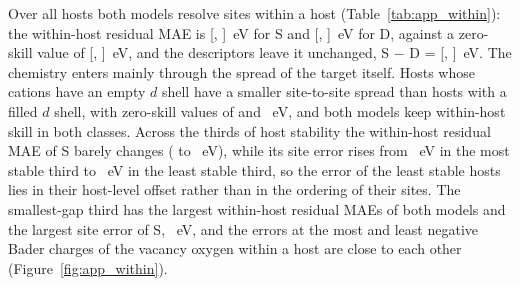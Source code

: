 Over all hosts both models resolve sites within a host (Table~\ref{tab:app_within}): the within-host residual MAE is \numNetWithinMaeS{} [\numNetWithinMaeSLo{}, \numNetWithinMaeSHi{}]~eV for S and \numNetWithinMaeD{} [\numNetWithinMaeDLo{}, \numNetWithinMaeDHi{}]~eV for D, against a zero-skill value of \numNetWithinZeroSkill{} [\numNetWithinZeroSkillLo{}, \numNetWithinZeroSkillHi{}]~eV, and the descriptors leave it unchanged, S $-$ D = \numNetWithinSMinusD{} [\numNetWithinSMinusDLo{}, \numNetWithinSMinusDHi{}]~eV. The chemistry enters mainly through the spread of the target itself. Hosts whose cations have an empty $d$ shell have a smaller site-to-site spread than hosts with a filled $d$ shell, with zero-skill values of \numWithinHostBreakdownGroupsDClassDZeroVTwoSZeroSkillMaePoint{} and \numWithinHostBreakdownGroupsDClassDTenVTwoSZeroSkillMaePoint{}~eV, and both models keep within-host skill in both classes. Across the thirds of host stability the within-host residual MAE of S barely changes (\numWithinHostBreakdownGroupsStabilityTercileLowerVTwoSWithinHostMaePoint{} to \numWithinHostBreakdownGroupsStabilityTercileUpperVTwoSWithinHostMaePoint{}~eV), while its site error rises from \numWithinHostBreakdownGroupsStabilityTercileLowerVTwoSMaePoint{}~eV in the most stable third to \numWithinHostBreakdownGroupsStabilityTercileUpperVTwoSMaePoint{}~eV in the least stable third, so the error of the least stable hosts lies in their host-level offset rather than in the ordering of their sites. The smallest-gap third has the largest within-host residual MAEs of both models and the largest site error of S, \numWithinHostBreakdownGroupsBandGapTercileLowerVTwoSMaePoint{}~eV, and the errors at the most and least negative Bader charges of the vacancy oxygen within a host are close to each other (Figure~\ref{fig:app_within}).

